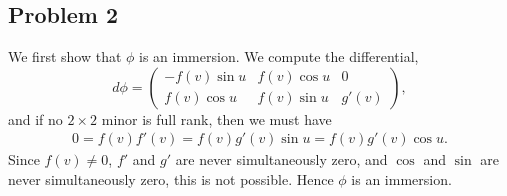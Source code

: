 \documentclass{../mathnotes}
\begin{document}
\subsection*{Problem 2}
We first show that $\phi$ is an immersion. We compute the differential,
\begin{equation*}
    d\phi =
    \begin{pmatrix}
        -f(v)\sin u & f(v)\cos u & 0\\
        f(v)\cos u & f(v)\sin u & g'(v)
    \end{pmatrix},
\end{equation*}
and if no $2\times 2$ minor is full rank, then we must have
\begin{align*}
    0=f(v)f'(v)=f(v)g'(v)\sin u=f(v)g'(v)\cos u.
\end{align*}
Since $f(v)\neq 0$, $f'$ and $g'$ are never simultaneously zero,
and $\cos$ and $\sin$ are never simultaneously zero, this is not possible.
Hence $\phi$ is an immersion.
\end{document}
